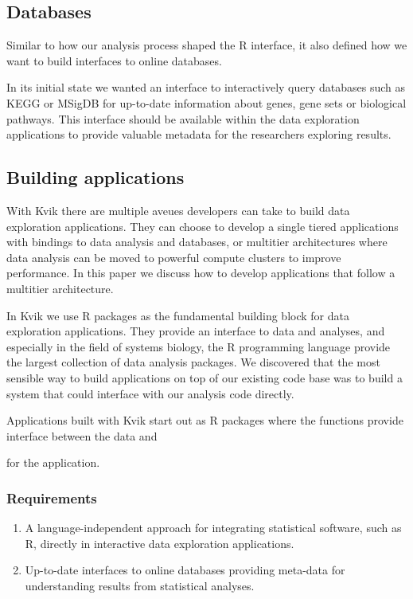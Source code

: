 \subsection*{Databases} 
Similar to how our analysis process shaped the R interface, it also defined how
we want to build interfaces to online databases. 

In its initial state we wanted an interface to interactively query databases
such as KEGG or MSigDB for up-to-date information about genes, gene sets or
biological pathways. This interface should be available within the data
exploration applications to provide valuable metadata for the researchers
exploring results.  

\subsection*{Building applications} 
With Kvik there are multiple aveues developers can take to build data
exploration applications. They can choose to develop a single tiered
applications with bindings to data analysis and databases, or
multitier architectures where data analysis can be moved to powerful compute
clusters to improve performance. In this paper we discuss how to develop
applications that follow a multitier architecture. 

In Kvik we use R packages as the fundamental building block for data exploration
applications. They provide an interface to data and analyses, and especially in
the field of systems biology, the R programming language provide the largest
collection of data analysis packages. %
We discovered that the most sensible way to build applications on top of our
existing code base was to build a system that could interface with our analysis
code directly. 

Applications built with Kvik start out as R packages where the functions provide
interface between the data and 

for the application. 



\subsubsection*{Requirements} 
\begin{enumerate}
    \item A language-independent approach for integrating statistical software,
    such as R, directly in interactive data exploration applications.
    \item Up-to-date interfaces to online databases providing meta-data for
    understanding results from statistical analyses. 
\end{enumerate} 

